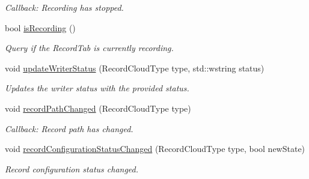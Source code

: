 \begin{DoxyCompactItemize}
\begin{DoxyCompactList}\small\item\em Callback\+: Recording has stopped. \end{DoxyCompactList}\item 
bool \hyperlink{class_record_tab_handler_aae5d39bded2dcc0dfa2fff625807e39b}{is\+Recording} ()
\begin{DoxyCompactList}\small\item\em Query if the Record\+Tab is currently recording. \end{DoxyCompactList}\item 
void \hyperlink{class_record_tab_handler_a88ad4f17404ff13c5d85c350b98da388}{update\+Writer\+Status} (Record\+Cloud\+Type type, std\+::wstring status)
\begin{DoxyCompactList}\small\item\em Updates the writer status with the provided status. \end{DoxyCompactList}\item 
void \hyperlink{class_record_tab_handler_a95b900a146875e4f73c6019d2266728b}{record\+Path\+Changed} (Record\+Cloud\+Type type)
\begin{DoxyCompactList}\small\item\em Callback\+: Record path has changed. \end{DoxyCompactList}\item 
void \hyperlink{class_record_tab_handler_a509e2af90482fd705268242df3e9f21c}{record\+Configuration\+Status\+Changed} (Record\+Cloud\+Type type, bool new\+State)
\begin{DoxyCompactList}\small\item\em Record configuration status changed. \end{DoxyCompactList}\end{DoxyCompactItemize}
